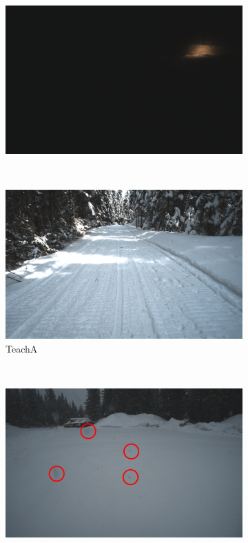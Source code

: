 \begin{figure}[htpb]
\begin{center}
\begin{subfigure}[b]{0.32\textwidth}
		\end{subfigure}
		~
		\begin{subfigure}[b]{0.32\textwidth}
			\includegraphics[width=\linewidth]{figs/camera/figure_camera_dark_top.pdf}
		\end{subfigure}%
		\\ \vspace{2mm}
		\begin{subfigure}[b]{0.32\textwidth}
			\includegraphics[width=\linewidth]{figs/camera/figure_camera_teachA_bottom.pdf}
			\caption{TeachA}
			\label{fig:cameras_a}
		\end{subfigure}%
		~
		\begin{subfigure}[b]{0.32\textwidth}
			\includegraphics[width=\linewidth]{figs/camera/figure_camera_run9_bottom.pdf}

\end{subfigure}
\end{center}
\end{figure}

